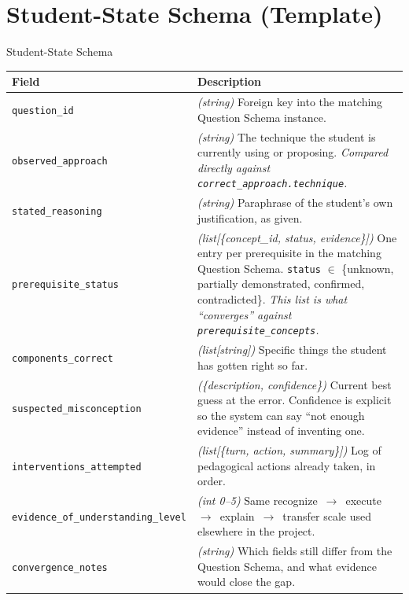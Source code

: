 \documentclass[11pt]{article}
\begin{document}
\section{Student-State Schema (Template)}

\begin{statebox}{Student-State Schema}
\small
\begin{tabularx}{\linewidth}{P{4.0cm} X}
\toprule
\textbf{Field} & \textbf{Description} \\
\midrule
\texttt{question\_\allowbreak id} & \textit{(string)} Foreign key into the matching Question Schema instance. \\
\texttt{observed\_\allowbreak approach} & \textit{(string)} The technique the student is currently using or proposing. \emph{Compared directly against \texttt{correct\_\allowbreak approach.technique}.} \\
\texttt{stated\_\allowbreak reasoning} & \textit{(string)} Paraphrase of the student's own justification, as given. \\
\texttt{prerequisite\_\allowbreak status} & \textit{(list[\{concept\_id, status, evidence\}])} One entry per prerequisite in the matching Question Schema. \texttt{status} $\in$ \{unknown, partially demonstrated, confirmed, contradicted\}. \emph{This list is what ``converges'' against \texttt{prerequisite\_\allowbreak concepts}.} \\
\texttt{components\_\allowbreak correct} & \textit{(list[string])} Specific things the student has gotten right so far. \\
\texttt{suspected\_\allowbreak misconception} & \textit{(\{description, confidence\})} Current best guess at the error. Confidence is explicit so the system can say ``not enough evidence'' instead of inventing one. \\
\texttt{interventions\_\allowbreak attempted} & \textit{(list[\{turn, action, summary\}])} Log of pedagogical actions already taken, in order. \\
\texttt{evidence\_\allowbreak of\_\allowbreak understanding\_\allowbreak level} & \textit{(int 0--5)} Same recognize~$\to$~execute~$\to$~explain~$\to$~transfer scale used elsewhere in the project. \\
\texttt{convergence\_\allowbreak notes} & \textit{(string)} Which fields still differ from the Question Schema, and what evidence would close the gap. \\
\bottomrule
\end{tabularx}
\end{statebox}
\end{document}
